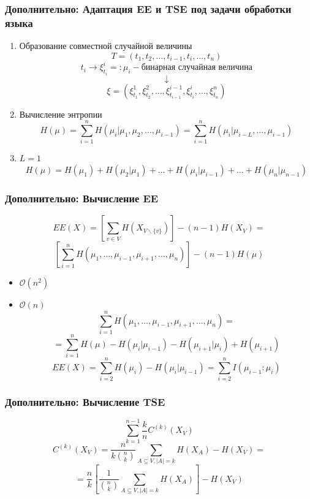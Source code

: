 \documentclass{beamer}
\begin{document}
\begin{frame}[label=supplemental,noframenumbering]
	\frametitle{Дополнительно: Адаптация EE и TSE под задачи обработки языка}
	
	\begin{enumerate}
		\item Образование совместной случайной величины
		\[
		T=(t_1, t_2, \ldots, t_{i-1},t_i,\ldots, t_n)
		\]
		\[
		t_i\rightarrow \xi^i_{t_i} =: \mu_i - \text{бинарная случайная величина}
		\]
		\[
		\downarrow
		\]
		\[
		\xi=(\xi^1_{t_1},\xi^2_{t_2},\ldots,\xi^{i-1}_{t_{i-1}},\xi^i_{t_i},\ldots,\xi^n_{t_n})
		\]
		\item Вычисление энтропии
		\[
		H(\mu) = \sum\limits_{i=1}^{n}H(\mu_i|\mu_1,\mu_2,\ldots,\mu_{i-1}) = \sum\limits_{i=1}^{n}H(\mu_i|\mu_{i-L},\ldots,\mu_{i-1})
		\]
		\item $L=1$
		\[
		H(\mu) = H(\mu_1) + H(\mu_2|\mu_1) + \ldots + H(\mu_i|\mu_{i-1}) + \ldots + H(\mu_n|\mu_{n-1})
		\]
	\end{enumerate}
\end{frame}

\begin{frame}[label=supplemental,noframenumbering]
	\frametitle{Дополнительно: Вычисление EE}
	\[
	EE(X) = \left[\sum\limits_{v\in V}H(X_{V\backslash\{v\}})\right] - (n - 1)H(X_V) = 
	\]
	\[
	\left[\sum\limits_{i=1}^{n}H(\mu_1,\ldots,\mu_{i-1},\mu_{i+1},\ldots,\mu_n)\right] - (n - 1)H(\mu)
	\]
	\begin{itemize}
		\item $\mathcal{O}(n^2)$
		\item $\mathcal{O}(n)$
		\[
		\sum\limits_{i=1}^{n}H(\mu_1,\ldots,\mu_{i-1},\mu_{i+1},\ldots,\mu_n) =\]
		\[ = \sum\limits_{i=1}^{n}H(\mu) - H(\mu_i|\mu_{i-1}) - H(\mu_{i+1}|\mu_i) + H(\mu_{i+1})\]
		\[
		EE(X) = \sum\limits_{i=2}^{n}H(\mu_i) - H(\mu_i|\mu_{i-1})= \sum\limits_{i=2}^{n}I(\mu_{i-1}\colon\mu_i)
		\]
	\end{itemize}
\end{frame}

\begin{frame}[label=supplemental,noframenumbering]
	\frametitle{Дополнительно: Вычисление TSE}
	\[
	\sum\limits_{k=1}^{n-1}\frac{k}{n}C^{(k)}(X_V)
	\]
	\[
	C^{(k)}(X_V) = \frac{n}{k\binom{n}{k}}\sum\limits_{A\subseteq V,|A|=k}H(X_A) - H(X_V) =
	\]
	\[
	= \frac{n}{k}\left[\frac{1}{\binom{n}{k}}\sum\limits_{A\subseteq V,|A|=k}H(X_A)\right] - H(X_V)
	\]
\end{frame}
\end{document}
